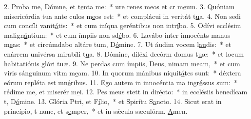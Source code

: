2. Proba me, Dómne, et t\uline{e}nta me:~* ure renes meos et cr m\uline{e}um.
3. Quóniam misericórdia tua ante culos m\uline{e}os est:~* et complácui in veritát t\uline{u}a.
4. Non sedi cum concíli vanit\uline{á}tis:~* et cum iníqua geréntibus non intr\uline{í}bo.
5. Odívi ecclésim malign\uline{á}ntium:~* et cum ímpiis non sd\uline{é}bo.
6. Lavábo inter innocénts manus m\uline{e}as:~* et circúmdabo altáre tum, D\uline{ó}mine.
7. Ut áudim vocem l\uline{au}dis:~* et enárrem univérsa mirabíli t\uline{u}a.
8. Dómine, diléxi decórm domus t\uline{u}æ:~* et locum habitatiónis glóri t\uline{u}æ.
9. Ne perdas cum ímpiis, Deus, nimam m\uline{e}am,~* et cum viris sánguinum vitm m\uline{e}am.
10. In quorum mánibus niquit\uline{á}tes sunt:~* déxtera eórum repléta est mn\uline{é}ribus.
11. Ego autem in innocéntia ma ingr\uline{é}ssus sum:~* rédime me, et miserér m\uline{e}i.
12. Pes meus stett in dir\uline{é}cto:~* in ecclésiis benedícam t, D\uline{ó}mine.
13. Glória Ptri, et F\uline{í}lio,~* et Spirítu S\uline{a}ncto.
14. Sicut erat in princípio, t nunc, et s\uline{e}mper,~* et in sǽcula sæculórm. \uline{A}men.
